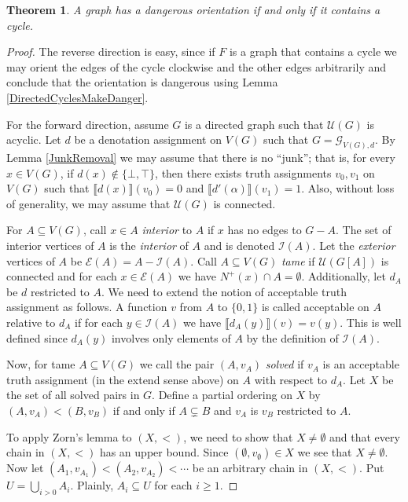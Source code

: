 \documentclass[12pt]{article}
\newtheorem{thm}{Theorem}
\theoremstyle{remark}
\newcommand{\fancy}[1]{\mathcal{#1}}
\def\G{\fancy{G}}
\def\I{\fancy{I}}
\def\U{\fancy{U}}
\def\E{\fancy{E}}
\begin{document}
\begin{thm}
A graph has a dangerous orientation if and only if it contains a cycle.
\end{thm}
\begin{proof}
The reverse direction is easy, since if $F$ is a graph that contains a cycle we may orient the edges of the cycle clockwise and the other edges arbitrarily and conclude that the orientation is dangerous using Lemma \ref{DirectedCyclesMakeDanger}.\newline

For the forward direction, assume $G$ is a directed graph such that $\U(G)$ is acyclic. Let $d$ be a denotation assignment on $V(G)$ such that $G = \G_{V(G), d}$.  By Lemma \ref{JunkRemoval} we may assume that there is no ``junk''; that is, for every $x \in V(G)$, if $d(x) \not \in \{\bot, \top\}$, then there exists truth assignments $v_0, v_1$ on $V(G)$ such that $\llbracket d(x)\rrbracket(v_0) = 0$ and  $\llbracket d'(\alpha)\rrbracket(v_1) = 1$.   Also, without loss of generality, we may assume that $\U(G)$ is connected.\newline

For $A \subseteq V(G)$, call $x \in A$ \emph{interior} to $A$ if $x$ has no edges to $G - A$.  The set of interior vertices of $A$ is the \emph{interior} of $A$ and is denoted $\I(A)$. Let the \emph{exterior} vertices of $A$ be $\E(A) = A - \I(A)$.  Call $A \subseteq V(G)$ \emph{tame} if $\U(G[A])$ is connected and for each $x \in \E(A)$ we have $N^+(x) \cap A = \emptyset$. Additionally, let $d_A$ be $d$ restricted to $A$.  We need to extend the notion of acceptable truth assignment as follows.  A function $v$ from $A$ to $\{0,1\}$ is called acceptable on $A$ relative to $d_A$ if for each $y \in \I(A)$ we have $\llbracket d_A(y) \rrbracket(v) = v(y)$.  This is well defined since $d_A(y)$ involves only elements of $A$ by the definition of $\I(A)$.\newline

Now, for tame $A \subseteq V(G)$ we call the pair $(A, v_A)$ \emph{solved} if $v_A$ is an acceptable truth assignment (in the extend sense above) on $A$ with respect to $d_A$.  Let $X$ be the set of all solved pairs in $G$.  Define a partial ordering on $X$ by $(A, v_A) < (B, v_B)$ if and only if $A \subsetneq B$ and $v_A$ is $v_B$ restricted to $A$.\newline

To apply Zorn's lemma to $(X, <)$, we need to show that $X \neq \emptyset$ and that every chain in  $(X, <)$ has an upper bound. Since $(\emptyset, v_\emptyset) \in X$ we see that $X \neq \emptyset$.  Now let $(A_1, v_{A_1}) < (A_2, v_{A_2}) < \cdots$ be an arbitrary chain in $(X, <)$.  Put $U = \bigcup_{i > 0} A_i$.  Plainly, $A_i \subseteq U$ for each $i \geq 1$.\newline


\end{proof}
\end{document}
